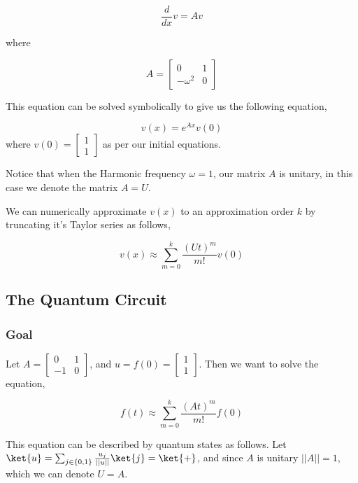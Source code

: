 \documentclass[11pt]{article}
\begin{document}
\begin{equation}
\frac{d}{dx} v = Av
\end{equation}

where

\begin{equation}
A = \begin{bmatrix}0 & 1\\ -\omega^{2} & 0\end{bmatrix}
\end{equation}

This equation can be solved symbolically to give us the following equation,

\begin{equation}
v(x) = e^{Ax}v(0)
\end{equation}
where \(v(0) = \begin{bmatrix}1 \\ 1\end{bmatrix}\) as per our initial equations.

Notice that when the Harmonic frequency \(\omega = 1\), our matrix \(A\) is unitary, in this case we denote the matrix \(A = U\).

We can numerically approximate \(v(x)\) to an approximation order \(k\) by truncating it's Taylor series as follows,

\begin{equation}
v(x) \approx \sum^{k}_{m=0} \frac{(Ut)^{m}}{m!}v(0)
\end{equation}
\subsection{The Quantum Circuit}
\label{sec:org98da7c2}
\subsubsection{Goal}
\label{sec:org3abc678}
Let \(A = \begin{bmatrix}0 & 1\\ -1 & 0\end{bmatrix}\), and \(u = f(0) = \begin{bmatrix}1\\ 1\end{bmatrix}\). Then we want to solve the equation,

\begin{equation}
f(t)\approx \sum^{k}_{m=0}\frac{(At)^{m}}{m!}f(0)
\end{equation}

This equation can be described by quantum states as follows. Let \(\ket{u}=\sum_{j\in \{0,1\}}\frac{u_{j}}{||u||}\ket{j}=\ket{+}\), and since \(A\) is unitary \(||A||=1\), which we can denote \(U=A\).
\end{document}
